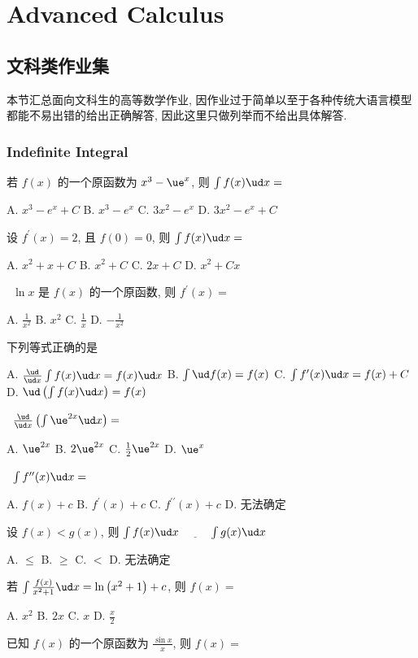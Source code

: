 \chapter{Advanced Calculus}
\section{文科类作业集}
本节汇总面向文科生的高等数学作业, 因作业过于简单以至于各种传统大语言模型都能不易出错的给出正确解答, 因此这里只做列举而不给出具体解答.
\subsection{Indefinite Integral}
\bq{}{}
若 $f(x)$ 的一个原函数为 $x^3-\ue^x$, 则 $\int f(x) \ud x=$

A. $x^3-e^x+C$\qquad
B. $x^3-e^x$\qquad
C. $3 x^2-e^x$\qquad
D. $3 x^2-e^x+C$
\eq

\bq{}{}
设 $f^{\prime}(x)=2$, 且 $f(0)=0$, 则 $\int f(x) \ud x=$

A. $x^2+x+C$\qquad
B. $x^2+C$\qquad
C. $2 x+C$\qquad
D. $x^2+C x$
\eq

\bq{}{}
\ $\ln x$ 是 $f(x)$ 的一个原函数, 则 $f^{\prime}(x)=$

A. $\frac{1}{x^2}$\qquad
B. $x^2$\qquad
C. $\frac{1}{x}$\qquad
D. $-\frac{1}{x^2}$
\eq

\bq{}{}
下列等式正确的是

A. $\frac{\ud}{\ud x} \int f(x) \ud x=f(x) \ud x$\qquad
B. $\int \ud f(x)=f(x)$\qquad
C. $\int f^{\prime}(x) \ud x=f(x)+C$\qquad
D. $\ud\left(\int f(x) \ud x\right)=f(x)$
\eq

\bq{}{}
\ $
\frac{\ud}{\ud x}\left(\int \ue^{2 x} \ud x\right)=
$

A. $\ue^{2 x}$\qquad
B. $2 \ue^{2 x}$\qquad
C. $\frac{1}{2} \ue^{2 x}$\qquad
D. $\ue^x$
\eq

\bq{}{}
\ $
\int f^{\prime \prime}(x) \ud x=
$


A. $f(x)+c$\qquad
B. $f^{\prime}(x)+c$\qquad
C. $f^{\prime \prime}(x)+c$\qquad
D. 无法确定
\eq

\bq{}{}
设 $f(x)<g(x)$, 则 $\int f(x) \ud x$ $\underline{\qquad}$ $\int g(x) \ud x$

A. $\leq$\qquad
B. $\geq$\qquad
C. $<$\qquad
D. 无法确定
\eq

\bq{}{}
若 $\int \frac{f(x)}{x^2+1} \ud x=\ln \left(x^2+1\right)+c$, 则 $f(x)=$

A. $x^2$\qquad
B. $2 x$\qquad
C. $x$\qquad
D. $\frac{x}{2}$
\eq

\bq{}{}
已知 $f(x)$ 的一个原函数为 $\frac{\sin x}{x}$, 则 $f(x)=$

